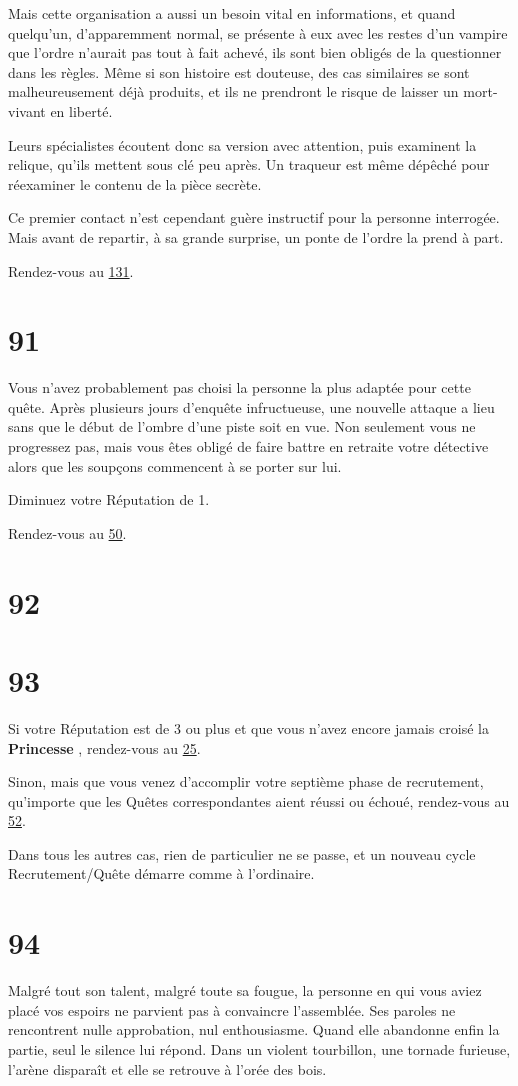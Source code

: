 \documentclass{report}
\newcommand{\gsection}[1]{
    \section{#1}
    \label{section-#1}
}
\newcommand{\glink}[1]{\hyperref[section-#1]{#1}}
\newcommand{\hero}[1]{
    \textbf{#1}
}
\begin{document}
Mais cette organisation a aussi un besoin vital en informations, et quand quelqu'un, d'apparemment normal, se présente à eux avec les restes d'un vampire que l'ordre n'aurait pas tout à fait achevé, ils sont bien obligés de la questionner dans les règles. Même si son histoire est douteuse, des cas similaires se sont malheureusement déjà produits, et ils ne prendront le risque de laisser un mort-vivant en liberté.

Leurs spécialistes écoutent donc sa version avec attention, puis examinent la relique, qu'ils mettent sous clé peu après. Un traqueur est même dépêché pour réexaminer le contenu de la pièce secrète.

Ce premier contact n'est cependant guère instructif pour la personne interrogée. Mais avant de repartir, à sa grande surprise, un ponte de l'ordre la prend à part.

Rendez-vous au \glink{131}.

\gsection{91}

Vous n'avez probablement pas choisi la personne la plus adaptée pour cette quête. Après plusieurs jours d'enquête infructueuse, une nouvelle attaque a lieu sans que le début de l'ombre d'une piste soit en vue. Non seulement vous ne progressez pas, mais vous êtes obligé de faire battre en retraite votre détective alors que les soupçons commencent à se porter sur lui. 

Diminuez votre Réputation de 1.

Rendez-vous au \glink{50}.

\gsection{92}

\gsection{93}

Si votre Réputation est de 3 ou plus et que vous n'avez encore jamais croisé la \hero{Princesse}, rendez-vous au \glink{25}.

Sinon, mais que vous venez d'accomplir votre septième phase de recrutement, qu'importe que les Quêtes correspondantes aient réussi ou échoué, rendez-vous au \glink{52}.

Dans tous les autres cas, rien de particulier ne se passe, et un nouveau cycle Recrutement/Quête démarre comme à l'ordinaire.

\gsection{94}

Malgré tout son talent, malgré toute sa fougue, la personne en qui vous aviez placé vos espoirs ne parvient pas à convaincre l'assemblée. Ses paroles ne rencontrent nulle approbation, nul enthousiasme. Quand elle abandonne enfin la partie, seul le silence lui répond. Dans un violent tourbillon, une tornade furieuse, l'arène disparaît et elle se retrouve à l'orée des bois.
\end{document}
